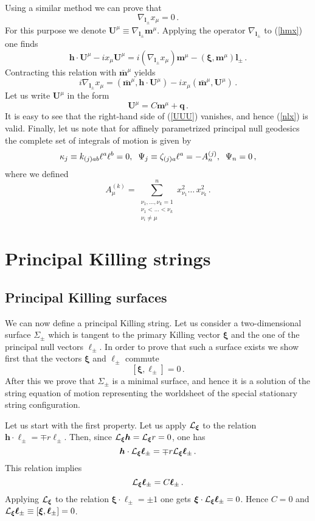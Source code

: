 \documentclass[superscriptaddress,twocolumn,showpacs,
preprintnumbers,amsmath,amssymb,nofootinbib,
longbibliography,aps,prd,10pt]{revtex4-1}
\newcommand{\hhh}{,\hspace{0.2cm}}
\newcommand{\ts}[1]{{\boldsymbol{#1}}}         %
\newcommand{\be}{\begin{equation}}             %
\newcommand{\ee}{\end{equation}}               %
\newcommand{\n}[1]{\label{#1}}
\begin{document}
Using a similar method we can prove that
\be\n{nlx}
\nabla_{\ts{l}_{\pm}}x_{\mu}=0\, .
\ee
For this purpose we denote $\ts{U}^{\mu} \equiv \nabla_{\ts{l}_{\pm}}\ts{m}^{\mu}$. Applying the operator $\nabla_{\ts{l}_{\pm}}$ to (\ref{hmx}) one finds
\be
\ts{h}\cdot \ts{U}^{\mu}-ix_{\mu}\ts{U}^{\mu}=i (\nabla_{\ts{l}_{\pm}} x_{\mu}) \ts{m}^\mu -(\ts{\xi},\ts{m}^{\mu}) \ts{l}_{\pm}\, .
\ee
Contracting this relation with $\bar{\ts{m}}^{\mu}$ yields
\be\n{UUU}
i \nabla_{\ts{l}_{\pm}} x_{\mu}=(\bar{\ts{m}}^{\mu},\ts{h}\cdot \ts{U}^{\mu})-ix_{\mu}(\bar{\ts{m}}^{\mu},\ts{U}^{\mu})\, .
\ee
Let us write $\ts{U}^{\mu}$ in the form
\be
\ts{U}^{\mu}=C \ts{m}^{\mu}+\ts{q}\, .
\ee
It is easy to see that the right-hand side of (\ref{UUU}) vanishes, and hence (\ref{nlx}) is valid. Finally, let us note that for affinely parametrized principal null geodesics the complete set of integrals of motion is given by \cite{Kubiznak:2008zs}
\be
\kappa_{j}\equiv k_{(j) ab} \ell^a \ell^b=0\hhh \Psi_j\equiv\zeta_{(j)a} \ell^a=-A_{n}^{(j)}\hhh\Psi_n=0\, ,
\ee
where we defined
\be
A^{(k)}_\mu = \sum\limits_{\substack{\nu_1,\dots,\nu_k=1 \\ \nu_1 < \dots < \nu_k \\\nu_i \not= \mu }}^n x{}_{\nu_1}^2 \dots \, x{}_{\nu_k}^2\, .
\ee

\section{Principal Killing strings}
\label{sec:pks}

\subsection{Principal Killing surfaces}

We can now define a principal Killing string. Let us consider a two-dimensional surface $\Sigma_{\pm}$ which is tangent to the primary Killing vector $\ts{\xi}$ and the one of the  principal null vectors $\ts{\ell}_{\pm}$. In order to prove that such a surface exists we show first that the vectors $\ts{\xi}$ and $\ts{\ell}_{\pm}$ commute
\be\n{xll}
[\ts{\xi},\ts{\ell}_{\pm}]=0\, .
\ee
After this we prove that $\Sigma_{\pm}$ is a minimal surface, and hence it is a solution of the string equation of motion representing the worldsheet of the special stationary string configuration.

Let us start with the first property. Let us apply ${\cal L}_{\ts{\xi}}$ to the relation
$\ts{h}\cdot \ts{\ell}_{\pm} =\mp r \ts{\ell}_{\pm}$. Then, since ${\cal L}_{\ts{\xi}}\ts{h}={\cal L}_{\ts{\xi}} r=0$, one has
\be
\ts{h}\cdot {\cal L}_{\ts{\xi}}\ts{\ell}_{\pm} =\mp r {\cal L}_{\ts{\xi}}\ts{\ell}_{\pm}\, .
\ee
This relation implies
\be
{\cal L}_{\ts{\xi}}\ts{\ell}_{\pm}=C \ts{\ell}_{\pm}\, .
\ee
Applying ${\cal L}_{\ts{\xi}}$  to the relation $\ts{\xi}\cdot \ts{\ell}_{\pm}=\pm 1$ one gets  $\ts{\xi}\cdot {\cal L}_{\ts{\xi}}\ts{\ell}_{\pm}=0$. Hence $C=0$ and ${\cal L}_{\ts{\xi}}\ts{\ell}_{\pm}\equiv [\ts{\xi},\ts{\ell}_{\pm}]=0$.
\end{document}
